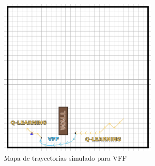 \begin{figure} [tp]
    \begin{center}
    \includegraphics[height=8cm]{imagenes/cap4/36_trj.png}
    \end{center}
    \caption[Mapa de trayectorias simulado para \ac{VFF}]{Mapa de trayectorias simulado para \ac{VFF}}
    \label{fig:vfftrj}
\end{figure}

